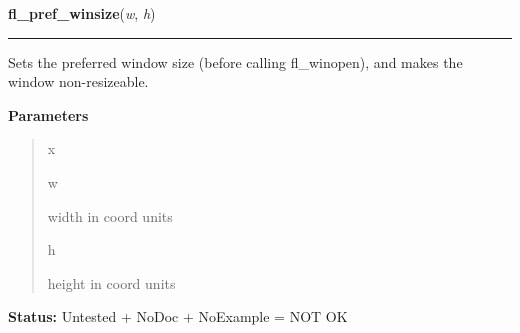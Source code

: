    \label{xformslib:library:fl_winsize}

    \vspace{0.5ex}

\hspace{.8\funcindent}\begin{boxedminipage}{\funcwidth}

    \raggedright \textbf{fl\_pref\_winsize}(\textit{w}, \textit{h})

    \vspace{-1.5ex}

    \rule{\textwidth}{0.5\fboxrule}
\setlength{\parskip}{2ex}
    Sets the preferred window size (before calling fl\_winopen), and makes 
    the window non-resizeable.

\setlength{\parskip}{1ex}
      \textbf{Parameters}
      \vspace{-1ex}

      \begin{quote}
        \begin{Ventry}{x}

          \item[w]

          width in coord units

          \item[h]

          height in coord units

        \end{Ventry}

      \end{quote}

\textbf{Status:} Untested + NoDoc + NoExample = NOT OK



    \end{boxedminipage}

    \label{xformslib:library:fl_initial_winsize}

    \vspace{0.5ex}

